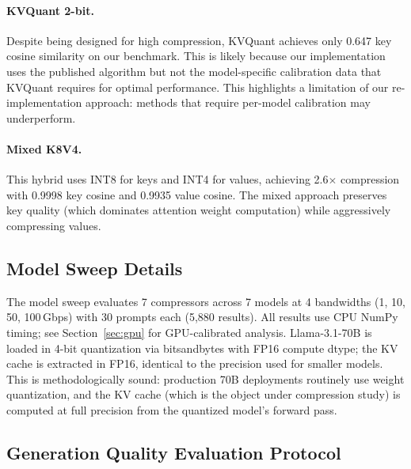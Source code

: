 \documentclass{article}
\begin{document}
\paragraph{KVQuant 2-bit.} Despite being designed for high compression, KVQuant achieves only 0.647 key cosine similarity on our benchmark. This is likely because our implementation uses the published algorithm but not the model-specific calibration data that KVQuant requires for optimal performance. This highlights a limitation of our re-implementation approach: methods that require per-model calibration may underperform.

\paragraph{Mixed K8V4.} This hybrid uses INT8 for keys and INT4 for values, achieving 2.6$\times$ compression with 0.9998 key cosine and 0.9935 value cosine. The mixed approach preserves key quality (which dominates attention weight computation) while aggressively compressing values.

\subsection{Model Sweep Details}

The model sweep evaluates 7 compressors across 7 models at 4 bandwidths (1, 10, 50, 100\,Gbps) with 30 prompts each (5{,}880 results). All results use CPU NumPy timing; see Section~\ref{sec:gpu} for GPU-calibrated analysis. Llama-3.1-70B is loaded in 4-bit quantization via bitsandbytes with FP16 compute dtype; the KV cache is extracted in FP16, identical to the precision used for smaller models. This is methodologically sound: production 70B deployments routinely use weight quantization, and the KV cache (which is the object under compression study) is computed at full precision from the quantized model's forward pass.

\subsection{Generation Quality Evaluation Protocol}
\end{document}
